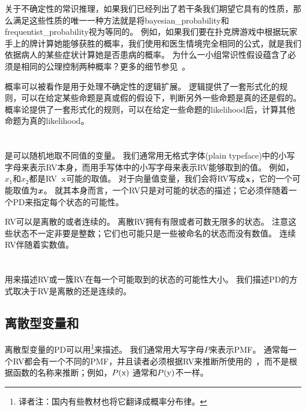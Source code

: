 关于不确定性的常识推理，如果我们已经列出了若干条我们期望它具有的性质，那么满足这些性质的唯一一种方法就是将\gls{bayesian_probability}和\gls{frequentist_probability}视为等同的。
例如，如果我们要在扑克牌游戏中根据玩家手上的牌计算她能够获胜的概率，我们使用和医生情境完全相同的公式，就是我们依据病人的某些症状计算她是否患病的概率。
为什么一小组常识性假设蕴含了必须是相同的公理控制两种概率？更多的细节参见~\cite{Ramsey1926}。


概率可以被看作是用于处理不确定性的逻辑扩展。
逻辑提供了一套形式化的规则，可以在给定某些命题是真或假的假设下，判断另外一些命题是真的还是假的。
概率论提供了一套形式化的规则，可以在给定一些命题的\gls{likelihood}后，计算其他命题为真的\gls{likelihood}。

\section{}
\label{sec:random_variables}

是可以随机地取不同值的变量。
我们通常用无格式字体(plain typeface)中的小写字母来表示\gls{RV}本身，而用手写体中的小写字母来表示\gls{RV}能够取到的值。
例如，$x_1$和$x_2$都是\gls{RV}~$\mathrm{x}$可能的取值。
对于向量值变量，我们会将\gls{RV}写成$\mathbf{x}$，它的一个可能取值为$\boldsymbol{\mathit{x}}$。
就其本身而言，一个\gls{RV}只是对可能的状态的描述；它必须伴随着一个\gls{PD}来指定每个状态的可能性。

\gls{RV}可以是离散的或者连续的。
离散\gls{RV}拥有有限或者可数无限多的状态。
注意这些状态不一定非要是整数；它们也可能只是一些被命名的状态而没有数值。
连续\gls{RV}伴随着实数值。

\section{}
\label{sec:probability_distributions}

用来描述\gls{RV}或一簇\gls{RV}在每一个可能取到的状态的可能性大小。
我们描述\gls{PD}的方式取决于\gls{RV}是离散的还是连续的。

\subsection{离散型变量和}
\label{sec:discrete_variables_and_probability_mass_functions}

离散型变量的\gls{PD}可以用\footnote{译者注：国内有些教材也将它翻译成概率分布律。}来描述。
我们通常用大写字母$P$来表示\gls{PMF}。
通常每一个\gls{RV}都会有一个不同的\gls{PMF}，并且读者必须根据\gls{RV}来推断所使用的~，而不是根据函数的名称来推断；例如，$P(\mathrm{x})$ 通常和$P(\mathrm{y})$不一样。

